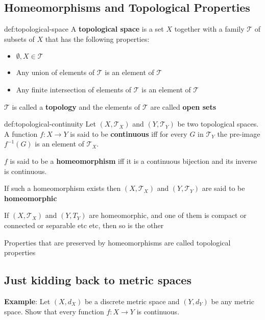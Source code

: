\documentclass[landscape, 8pt]{extarticle}
\begin{document}
\begin{multicols}{3}
\subsection{Homeomorphisms and Topological Properties}
\begin{dfn}{def:topological-space}{}
    A \textbf{topological space} is a set $X$ together with a family $\mathcal{T}$ of subsets of $X$ that has the following properties:
    \begin{itemize}
        \item $\emptyset,X\in \mathcal{T}$
        \item Any union of elements of $\mathcal{T}$ is an element of $\mathcal{T}$
        \item Any finite intersection of elements of $\mathcal{T}$ is an element of $\mathcal{T}$
    \end{itemize}
    $\mathcal{T}$ is called a \textbf{topology} and the elements of $\mathcal{T}$ are called \textbf{open sets}
\end{dfn}

\begin{dfn}{def:topological-continuity}{}
    Let $(X, \mathcal{T}_{X})$ and $(Y, \mathcal{T}_{Y})$ be two topological spaces. A function $f : X \to Y$ is said to be \textbf{continuous} iff for every $G$ in $\mathcal{T}_{Y}$ the pre-image $f^{-1}(G)$ is an element of $\mathcal{T}_{X}$.

    $f$ is said to be a \textbf{homeomorphism} iff it is a continuous bijection and its inverse is continuous.

    If such a homeomorphism exists then $(X, \mathcal{T}_{X})$ and $(Y, \mathcal{T}_{Y})$ are said to be \textbf{homeomorphic}
\end{dfn}

If $(X, \mathcal{T}_{X})$ and $(Y, T_{Y})$ are homeomorphic, and one of them is compact or connected or separable etc etc, then so is the other

Properties that are preserved by homeomorphisms are called topological properties

\subsection{Just kidding back to metric spaces}


\textbf{Example}: Let $(X, d_{X})$ be a discrete metric space and $(Y, d_{Y})$ be any metric space. Show that every function $f : X \to Y$ is continuous.


\end{multicols}
\end{document}
